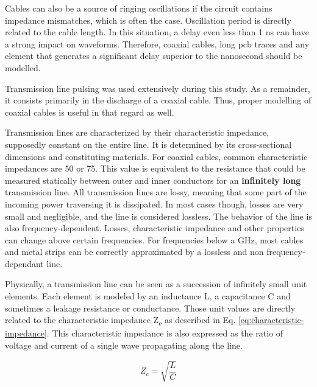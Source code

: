 Cables can also be a source of ringing oscillations if the circuit contains impedance mismatches, which is often the case.
Oscillation period is directly related to the cable length.
In this situation, a delay even less than 1 ns can have a strong impact on waveforms.
Therefore, coaxial cables, long \gls{pcb} traces and any element that generates a significant delay superior to the nanosecond should be modelled.

Transmission line pulsing was used extensively during this study.
As a remainder, it consists primarily in the discharge of a coaxial cable.
Thus, proper modelling of coaxial cables is useful in that regard as well.

Transmission lines are characterized by their characteristic impedance, supposedly constant on the entire line.
It is determined by its cross-sectional dimensions and constituting materials.
For coaxial cables, common characteristic impedances are 50\textOmega{} or 75\textOmega{}.
This value is equivalent to the resistance that could be measured statically between outer and inner conductors for an \textbf{infinitely long} transmission line.
All transmission lines are lossy, meaning that some part of the incoming power traversing it is dissipated.
In most cases though, losses are very small and negligible, and the line is considered lossless.
The behavior of the line is also frequency-dependent.
Losses, characteristic impedance and other properties can change above certain frequencies.
For frequencies below a GHz, most cables and metal strips can be correctly approximated by a lossless and non frequency-dependant line.

Physically, a transmission line can be seen as a succession of infinitely small unit elements.
Each element is modeled by an inductance L, a capacitance C and sometimes a leakage resistance or conductance.
Those unit values are directly related to the characteristic impedance Z\textsubscript{c} as described in Eq. \ref{eq:characteristic-impedance}.
This characteristic impedance is also expressed as the ratio of voltage and current of a single wave propagating along the line.

\begin{equation}
Z_{c} = \sqrt{\frac{L}{C}}
\label{eq:characteristic-impedance}
\end{equation}

